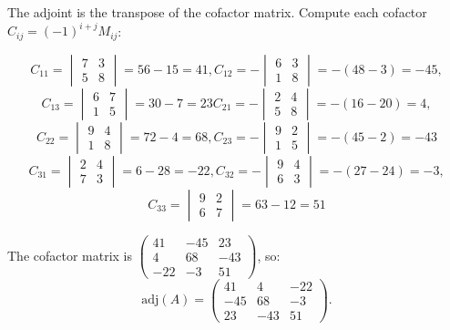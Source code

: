 \documentclass[12pt,a3paper]{article}
\begin{document}
\begin{tcolorbox}[enhanced,breakable,
  colback=cA!4,colframe=cA,boxrule=0.8pt,arc=5pt,
  title={\textbf{Answer --- Adjoint of $A = \begin{pmatrix}9&2&4\\6&7&3\\1&5&8\end{pmatrix}$}},
  fonttitle=\bfseries\color{white},colbacktitle=cA]
 
The adjoint is the transpose of the cofactor matrix.
Compute each cofactor $C_{ij} = (-1)^{i+j}M_{ij}$:
 
\[
C_{11}=\begin{vmatrix}7&3\\5&8\end{vmatrix}=56-15=41,
C_{12}=-\begin{vmatrix}6&3\\1&8\end{vmatrix}=-(48-3)=-45,
 \]
\[
C_{13}=\begin{vmatrix}6&7\\1&5\end{vmatrix}=30-7=23
C_{21}=-\begin{vmatrix}2&4\\5&8\end{vmatrix}=-(16-20)=4,
\]
\[
C_{22}=\begin{vmatrix}9&4\\1&8\end{vmatrix}=72-4=68,
C_{23}=-\begin{vmatrix}9&2\\1&5\end{vmatrix}=-(45-2)=-43
\]
\[
C_{31}=\begin{vmatrix}2&4\\7&3\end{vmatrix}=6-28=-22,
C_{32}=-\begin{vmatrix}9&4\\6&3\end{vmatrix}=-(27-24)=-3,
\]
\[
C_{33}=\begin{vmatrix}9&2\\6&7\end{vmatrix}=63-12=51
\]
 
The cofactor matrix is
$\begin{pmatrix}41&-45&23\\4&68&-43\\-22&-3&51\end{pmatrix}$, so:
\[
  \mathrm{adj}(A) = \begin{pmatrix}41&4&-22\\-45&68&-3\\23&-43&51\end{pmatrix}.
\]
 
\end{tcolorbox}
 
\end{document}
